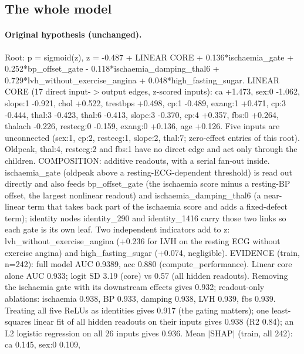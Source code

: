 \documentclass[a4paper,10pt]{article}
\newif\ifreviewmarks
\newcommand{\reviewrule}{\noindent{\color{BrickRed}\rule{\linewidth}{0.8pt}}}
\newenvironment{drafted}[1][]{%
  \ifreviewmarks\par\addvspace{\medskipamount}\reviewrule\par\nopagebreak
  \noindent{\color{BrickRed}\sffamily\footnotesize\textbf{Thesis Draft}\quad #1\hfill review}\par\nopagebreak\smallskip\fi}{%
  \ifreviewmarks\par\smallskip\noindent{\color{BrickRed}\sffamily\footnotesize end of thesis draft}\par\nopagebreak\reviewrule\par\medskip\fi}
\begin{document}
\begin{drafted}[plain-language layer: heart-s5-c2]
\subsection{The whole model}\label{tech:ann38}
\paragraph{Original hypothesis (unchanged).} Root: p = sigmoid(z), z = -0.487 + LINEAR CORE + 0.136*ischaemia\_\allowbreak{}gate + 0.252*bp\_\allowbreak{}offset\_\allowbreak{}gate - 0.118*\allowbreak{}ischaemia\_\allowbreak{}damping\_\allowbreak{}thal6 + 0.729*\allowbreak{}lvh\_\allowbreak{}without\_\allowbreak{}exercise\_\allowbreak{}angina + 0.048*\allowbreak{}high\_\allowbreak{}fasting\_\allowbreak{}sugar. LINEAR CORE (17 direct input-$>$output edges, z-scored inputs): ca +1.473, sex:0 -1.062, slope:1 -0.921, chol +0.522, trestbps +0.498, cp:1 -0.489, exang:1 +0.471, cp:3 -0.444, thal:3 -0.423, thal:6 -0.413, slope:3 -0.370, cp:4 +0.357, fbs:0 +0.264, thalach -0.226, restecg:0 -0.159, exang:0 +0.136, age +0.126. Five inputs are unconnected (sex:1, cp:2, restecg:1, slope:2, thal:7; zero-effect entries of this root). Oldpeak, thal:4, restecg:2 and fbs:1 have no direct edge and act only through the children. COMPOSITION: additive readouts, with a serial fan-out inside. ischaemia\_\allowbreak{}gate (oldpeak above a resting-ECG-dependent threshold) is read out directly and also feeds bp\_\allowbreak{}offset\_\allowbreak{}gate (the ischaemia score minus a resting-BP offset, the largest nonlinear readout) and ischaemia\_\allowbreak{}damping\_\allowbreak{}thal6 (a near-linear term that takes back part of the ischaemia score and adds a fixed-defect term); identity nodes identity\_\allowbreak{}290 and identity\_\allowbreak{}1416 carry those two links so each gate is its own leaf. Two independent indicators add to z: lvh\_\allowbreak{}without\_\allowbreak{}exercise\_\allowbreak{}angina (+0.236 for LVH on the resting ECG without exercise angina) and high\_\allowbreak{}fasting\_\allowbreak{}sugar (+0.074, negligible). EVIDENCE (train, n=242): full model AUC 0.9389, acc 0.880 (compute\_\allowbreak{}performance)\allowbreak{}. Linear core alone AUC 0.933; logit SD 3.19 (core) vs 0.57 (all hidden readouts). Removing the ischaemia gate with its downstream effects gives 0.932; readout-only ablations: ischaemia 0.938, BP 0.933, damping 0.938, LVH 0.939, fbs 0.939. Treating all five ReLUs as identities gives 0.917 (the gating matters); one least-squares linear fit of all hidden readouts on their inputs gives 0.938 (R2 0.84); an L2 logistic regression on all 26 inputs gives 0.936. Mean $|$SHAP$|$ (train, all 242): ca 0.145, sex:0 0.109, 
\end{drafted}
\end{document}
